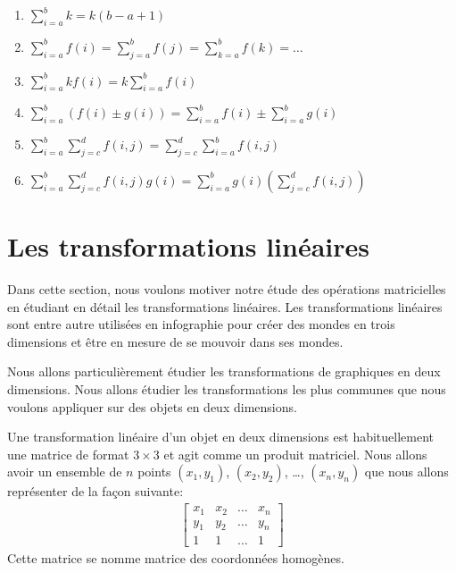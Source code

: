 \documentclass[]{book}
\providecommand{\tightlist}{%
  \setlength{\itemsep}{0pt}\setlength{\parskip}{0pt}}
\theoremstyle{definition}
\theoremstyle{definition}
\theoremstyle{definition}
\theoremstyle{remark}
\begin{document}
\begin{enumerate}
\def\labelenumi{\arabic{enumi}.}
\tightlist
\item
  \(\sum\limits_{i=a}^b k = k (b-a+1)\)
\item
  \(\sum\limits_{i=a}^b f(i) = \sum\limits_{j=a}^b f(j) = \sum\limits_{k=a}^b f(k) = \ldots\)
\item
  \(\sum\limits_{i=a}^b k f(i) = k \sum\limits_{i=a}^b f(i)\)
\item
  \(\sum\limits_{i=a}^b (f(i)\pm g(i)) = \sum\limits_{i=a}^b f(i) \pm \sum\limits_{i=a}^b g(i)\)
\item
  \(\sum\limits_{i=a}^b \sum\limits_{j=c}^d f(i,j) = \sum\limits_{j=c}^d \sum\limits_{i=a}^b f(i,j)\)
\item
  \(\sum\limits_{i=a}^b \sum\limits_{j=c}^d f(i,j)g(i) = \sum\limits_{i=a}^b g(i) \left(\sum\limits_{j=c}^d f(i,j)\right)\)
\end{enumerate}

\hypertarget{transfos-lineaires}{%
\chapter{Les transformations linéaires}\label{transfos-lineaires}}

Dans cette section, nous voulons motiver notre étude des opérations matricielles en étudiant en détail les transformations linéaires. Les transformations linéaires sont entre autre utilisées en infographie pour créer des mondes en trois dimensions et être en mesure de se mouvoir dans ses mondes.

Nous allons particulièrement étudier les transformations de graphiques en deux dimensions. Nous allons étudier les transformations les plus communes que nous voulons appliquer sur des objets en deux dimensions.

Une transformation linéaire d'un objet en deux dimensions est habituellement une matrice de format \(3\times 3\) et agit comme un produit matriciel. Nous allons avoir un ensemble de \(n\) points \((x_1,y_1)\), \((x_2,y_2)\), \ldots{}, \((x_n,y_n)\) que nous allons représenter de la façon suivante:
\begin{align*}
\begin{bmatrix}
x_1 & x_2 & \ldots & x_n \\
y_1 & y_2 & \ldots & y_n\\
1&1&\ldots &1
\end{bmatrix}
\end{align*}
Cette matrice se nomme matrice des coordonnées homogènes.
\end{document}
